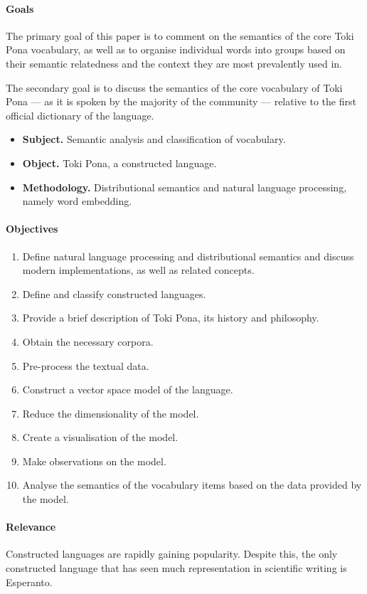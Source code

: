 \documentclass[14pt, a4paper]{extreport}
\begin{document}
\paragraph{Goals}
The primary goal of this paper is to comment on the semantics of the core Toki Pona vocabulary, as well as to organise individual words into groups based on their semantic relatedness and the context they are most prevalently used in.

The secondary goal is to discuss the semantics of the core vocabulary of Toki Pona --- as it is spoken by the majority of the community --- relative to the first official dictionary of the language.

\begin{itemize}
  \item \textbf{Subject.} Semantic analysis and classification of vocabulary.
  \item \textbf{Object.} Toki Pona, a constructed language.
  \item \textbf{Methodology.} Distributional semantics and natural language processing, namely word embedding.
\end{itemize}
\paragraph{Objectives}
\begin{enumerate}
  \item Define natural language processing and distributional semantics and discuss modern implementations, as well as related concepts.
  \item Define and classify constructed languages.
  \item Provide a brief description of Toki Pona, its history and philosophy.
  \item Obtain the necessary corpora.
  \item Pre-process the textual data.
  \item Construct a vector space model of the language.
  \item Reduce the dimensionality of the model.
  \item Create a visualisation of the model.
  \item Make observations on the model.
  \item Analyse the semantics of the vocabulary items based on the data provided by the model.
\end{enumerate}
\paragraph{Relevance}
Constructed languages are rapidly gaining popularity. Despite this, the only constructed language that has seen much representation in scientific writing is Esperanto.
\end{document}
